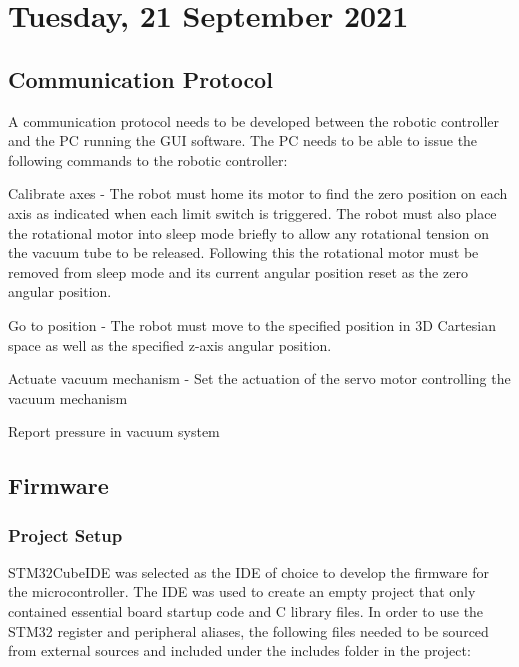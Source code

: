 \pendsign

\section[2021/09/21]{Tuesday, 21 September 2021}

\subsection{Communication Protocol}


A communication protocol needs to be developed between the robotic controller and the PC running the \ac{GUI} software. The PC needs to be able to issue the following commands to the robotic controller:

\begin{compactitem}
	\item Calibrate axes - The robot must home its motor to find the zero position on each axis as indicated when each limit switch is triggered. The robot must also place the rotational motor into sleep mode briefly to allow any rotational tension on the vacuum tube to be released. Following this the rotational motor must be removed from sleep mode and its current angular position reset as the zero angular position. 
	\item Go to position - The robot must move to the specified position in 3D Cartesian space as well as the specified z-axis angular position.
	\item Actuate vacuum mechanism - Set the actuation of the servo motor controlling the vacuum mechanism
	\item Report pressure in vacuum system
\end{compactitem}

\subsection{Firmware}

\subsubsection{Project Setup}

STM32CubeIDE was selected as the IDE of choice to develop the firmware for the microcontroller. The IDE was used to create an empty project that only contained essential board startup code and C library files. In order to use the STM32 register and peripheral aliases, the following files needed to be sourced from external sources and included under the includes folder in the project:


